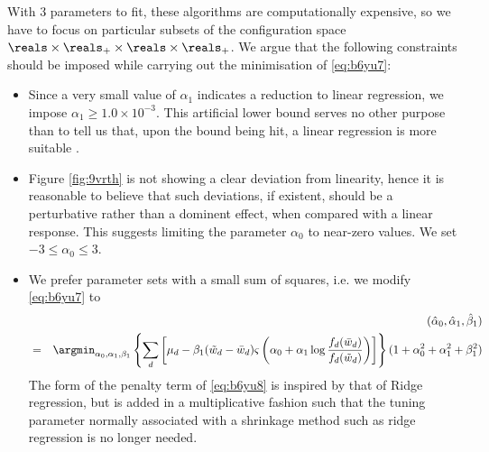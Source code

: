 \documentclass[a4paper,11pt,pdftex,twoside,titlepage]{article}
\begin{document}
With 3 parameters to fit, these algorithms are computationally
expensive, so we have to focus on particular subsets of the
configuration space
$\reals \times \reals_+ \times \reals \times \reals_+$.
We argue that the following constraints should be imposed while
carrying out the minimisation of \eqref{eq:b6yu7}:
\begin{itemize}
\item Since a very small value of $\alpha_1$ indicates a reduction to
  linear regression, we impose
  $\alpha_1 \geq 1.0 \times 10^{-3}$. This artificial lower bound
  serves no other purpose than to tell us that, upon the bound being hit,
  a linear regression is more suitable .

\item Figure \ref{fig:9vrth} is not showing a clear deviation from
  linearity, hence it is reasonable to believe that such deviations, if
  existent, should be a perturbative rather than a dominent effect, when
  compared with a linear response. This suggests limiting the parameter
  $\alpha_0$ to near-zero values. We set $-3 \leq \alpha_0 \leq 3$.
\item We prefer parameter sets with a small sum of squares, i.e. we
  modify \eqref{eq:b6yu7} to
  \begin{eqnarray}
    && (\hat \alpha_0, \hat \alpha_1, \hat \beta_1)
       \label{eq:b6yu8} \\
    &=&
        \argmin_{\alpha_0, \alpha_1, \beta_1}
        \left\{
        \sum_d \left[
        \mu_d - \beta_1  (\tilde w_d - \bar w_d)
        \varsigma\left(
        \alpha_0 + \alpha_1 \log{f_d(\bar w_d) \over f_d(\tilde w_d)}
        \right)
        \right]
        \right\}
        (1 + \alpha_0^2  + \alpha_1^2 + \beta_1^2)
        \nonumber
  \end{eqnarray}
  The form of the penalty term of \eqref{eq:b6yu8} is inspired by that
  of Ridge regression, but is added in a multiplicative fashion such
  that the tuning parameter normally associated with a shrinkage method
  such as ridge regression is no longer needed.
\end{itemize}
\end{document}

